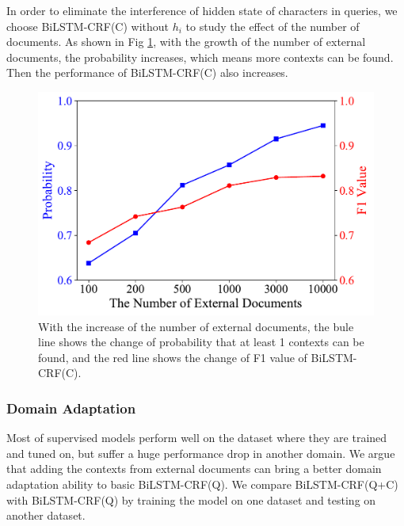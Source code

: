 In order to eliminate the interference of hidden state of characters in queries, we choose BiLSTM-CRF(C) without $h_i$ to study the effect of the number of documents. As shown in Fig \ref{fig:alpha}, with the growth of the number of external documents, the probability increases, which means more contexts can be found. Then the performance of BiLSTM-CRF(C) also increases.

\begin{figure}[th]
	\centering
	\includegraphics[width=0.7\columnwidth]{figures/result-2.pdf}
	\caption{With the increase of the number of external documents, the bule line shows the change of probability that at least 1 contexts can be found, and the red line shows the change of F1 value of BiLSTM-CRF(C).}
	\label{fig:alpha}
\end{figure}


\subsubsection{Domain Adaptation}

Most of supervised models perform well on the dataset where they are trained and tuned on, but suffer a huge performance drop in another domain. We argue that adding the contexts from external documents can bring a better domain adaptation ability to basic BiLSTM-CRF(Q). We compare BiLSTM-CRF(Q+C) with BiLSTM-CRF(Q) by training the model on one dataset and testing on another dataset.

